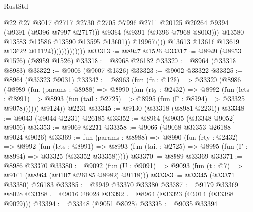 \begin{lexlean}{RustStd}
\begin{coremodule}
                                              @22
                                              @27
                                              @3017
                                              @2717
                                              @2730
                                              @2705
                                              @7996
                                              @2711
                                              @20125
                                              @20264
                                              @9394
                                              (@9391 (@9396 @7997 @2717)))
                                            @9394
                                            (@9391 (@9396 @7968 @8003)))
                                          @13580
                                          @13583
                                          @13586
                                          @13590
                                          @13595
                                          @13601))
                                      @19967))))
                              @13613
                              @13616
                              @13619
                              @13622
                              @10124)))))))))))))
@33313 := @8947 @1526
@33317 := @8949 (@8953 @1526) (@8959 @1526)
@33318 := @8968 @26182
@33320 := @8964 (@33318 @8983)
@33322 := @9006 (@9007 @1526)
@33323 := @9002 @33322
@33325 := @8964 (@33323 @9031)
@33342 := @8963
    (fun (fn : @128) =>
    @33320
      (@8986
        (@8989
          (fun (params : @8988) =>
          @8990
            (fun (rty : @2432) =>
            @8992
              (fun (lets : @8991) =>
              @8993 (fun (tail : @2725) => @8995 (fun (Γ : @8994) => @33325 @9078))))))
        @9124))
    @2231
@33345 := @9130 (@33318 (@8981 @2231))
@33348 := @9043 (@9044 @2231) @26185
@33352 := @8964 (@9035 (@33348 @9052) @9056)
@33353 := @9069 @2231
@33358 := @9066 (@9068 @33353 @26188 @9024 @9026)
@33369 := fun (params : @8988) =>
  @8990
    (fun (rty : @2432) =>
    @8992
      (fun (lets : @8991) =>
      @8993 (fun (tail : @2725) => @8995 (fun (Γ : @8994) => @33325 (@33352 @33358)))))
@33370 := @8989 @33369
@33371 := @8986 @33370
@33380 := @9092
    (fun (U : @9091) => @9093 (fun (t : @7) => @9101 (@8964 (@9107 @26185 @8982) @9118)))
@33383 := @33345 (@33371 @33380) @26183
@33385 := @8949 @33370 @33380
@33387 := @9179 @33369 @8028
@33388 := @9016 @8028
@33392 := @8964 (@33323 (@9014 (@33388 @9029)))
@33394 := @33348 (@9051 @8028)
@33395 := @9035 @33394

\end{coremodule}
\end{lexlean}
